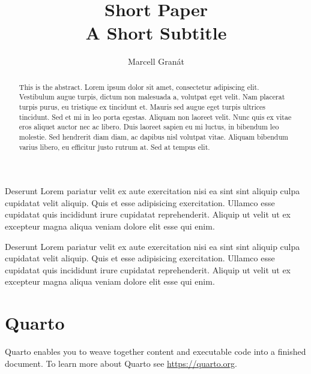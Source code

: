 \documentclass[
  authoryear]{elsarticle}
\begin{document}
\begin{frontmatter}
\title{Short Paper \\\large{A Short Subtitle} }
\author[1]{Marcell Granát%
%
}



        
\begin{abstract}
This is the abstract. Lorem ipsum dolor sit amet, consectetur adipiscing
elit. Vestibulum augue turpis, dictum non malesuada a, volutpat eget
velit. Nam placerat turpis purus, eu tristique ex tincidunt et. Mauris
sed augue eget turpis ultrices tincidunt. Sed et mi in leo porta
egestas. Aliquam non laoreet velit. Nunc quis ex vitae eros aliquet
auctor nec ac libero. Duis laoreet sapien eu mi luctus, in bibendum leo
molestie. Sed hendrerit diam diam, ac dapibus nisl volutpat vitae.
Aliquam bibendum varius libero, eu efficitur justo rutrum at. Sed at
tempus elit.
\end{abstract}





\end{frontmatter}
    \ifdefined\Shaded\renewenvironment{Shaded}{\begin{tcolorbox}[breakable, enhanced, boxrule=0pt, interior hidden, sharp corners, frame hidden, borderline west={3pt}{0pt}{shadecolor}]}{\end{tcolorbox}}\fi

Deserunt Lorem pariatur velit ex aute exercitation nisi ea sint sint
aliquip culpa cupidatat velit aliquip. Quis et esse adipisicing
exercitation. Ullamco esse cupidatat quis incididunt irure cupidatat
reprehenderit. Aliquip ut velit ut ex excepteur magna aliqua veniam
dolore elit esse qui enim.

Deserunt Lorem pariatur velit ex aute exercitation nisi ea sint sint
aliquip culpa cupidatat velit aliquip. Quis et esse adipisicing
exercitation. Ullamco esse cupidatat quis incididunt irure cupidatat
reprehenderit. Aliquip ut velit ut ex excepteur magna aliqua veniam
dolore elit esse qui enim.

\hypertarget{quarto}{%
\section{Quarto}\label{quarto}}

Quarto enables you to weave together content and executable code into a
finished document. To learn more about Quarto see
\url{https://quarto.org}.
\end{document}
